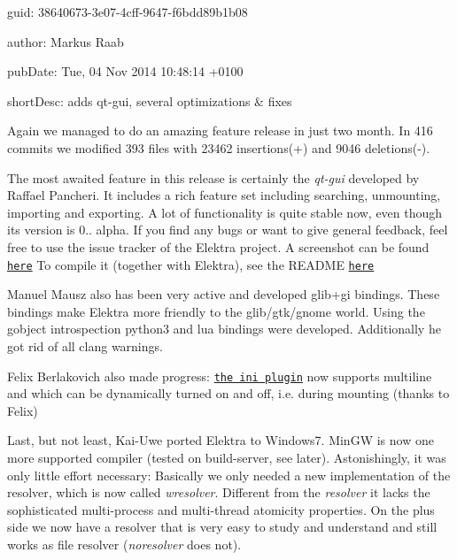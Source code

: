 
\begin{DoxyItemize}
\item guid\+: 38640673-\/3e07-\/4cff-\/9647-\/f6bdd89b1b08
\item author\+: Markus Raab
\item pub\+Date\+: Tue, 04 Nov 2014 10\+:48\+:14 +0100
\item short\+Desc\+: adds qt-\/gui, several optimizations \& fixes
\end{DoxyItemize}

Again we managed to do an amazing feature release in just two month. In 416 commits we modified 393 files with 23462 insertions(+) and 9046 deletions(-\/).

The most awaited feature in this release is certainly the {\itshape qt-\/gui} developed by Raffael Pancheri. It includes a rich feature set including searching, unmounting, importing and exporting. A lot of functionality is quite stable now, even though its version is 0.. alpha. If you find any bugs or want to give general feedback, feel free to use the issue tracker of the Elektra project. A screenshot can be found \href{https://github.com/ElektraInitiative/libelektra/blob/master/doc/images/screenshot-qt-gui.png}{\tt here} To compile it (together with Elektra), see the R\+E\+A\+D\+ME \href{https://github.com/ElektraInitiative/libelektra/tree/master/src/tools/qt-gui}{\tt here}

Manuel Mausz also has been very active and developed glib+gi bindings. These bindings make Elektra more friendly to the glib/gtk/gnome world. Using the gobject introspection python3 and lua bindings were developed. Additionally he got rid of all clang warnings.

Felix Berlakovich also made progress\+: \href{https://github.com/ElektraInitiative/libelektra/tree/master/src/plugins/ini}{\tt the ini plugin} now supports multiline and which can be dynamically turned on and off, i.\+e. during mounting (thanks to Felix)

Last, but not least, Kai-\/\+Uwe ported Elektra to Windows7. Min\+GW is now one more supported compiler (tested on build-\/server, see later). Astonishingly, it was only little effort necessary\+: Basically we only needed a new implementation of the resolver, which is now called {\itshape wresolver}. Different from the {\itshape resolver} it lacks the sophisticated multi-\/process and multi-\/thread atomicity properties. On the plus side we now have a resolver that is very easy to study and understand and still works as file resolver ({\itshape noresolver} does not).

